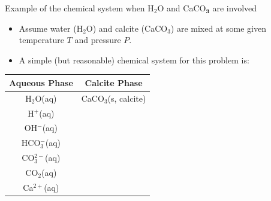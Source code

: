 %
\begin{frame}{Example of the chemical system when H$_{2}$O and CaCO$_{\boldsymbol{3}}$
are involved}
\begin{itemize}
\item Assume water (H$_{2}$O) and calcite (CaCO$_{3}$) are mixed at some
given temperature $T$ and pressure $P$.
\pause
\item A simple (but reasonable) chemical system for this problem is:
\end{itemize}
\begin{center}
\begin{tabular}{cc}
\toprule 
\multicolumn{1}{c}{\textbf{Aqueous Phase}} & \textbf{Calcite Phase}\tabularnewline
\midrule
H$_{2}$O(aq) & CaCO$_{3}$(s, calcite)\tabularnewline
H$^{+}$(aq) & \tabularnewline
OH$^{-}$(aq) & \tabularnewline
HCO$_{3}^{-}$(aq) & \tabularnewline
CO$_{3}^{2-}$(aq) & \tabularnewline
CO$_{2}$(aq) & \tabularnewline
Ca$^{2+}$(aq)  & \tabularnewline
\bottomrule
\end{tabular}
\par\end{center}

\end{frame}
%
%
